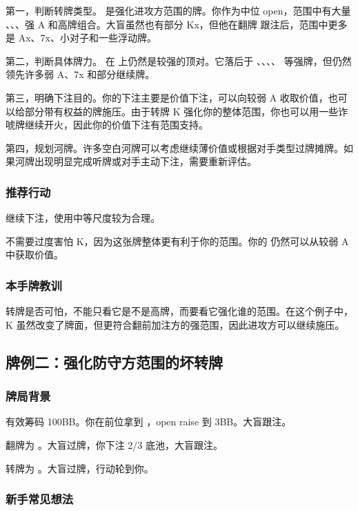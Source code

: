 第一，判断转牌类型。 是强化进攻方范围的牌。你作为中位 open，范围中有大量 、、、强 A 和高牌组合。大盲虽然也有部分 Kx，但他在翻牌  跟注后，范围中更多是 Ax、7x、小对子和一些浮动牌。

第二，判断具体牌力。 在  上仍然是较强的顶对。它落后于 、、、、 等强牌，但仍然领先许多弱 A、7x 和部分继续牌。

第三，明确下注目的。你的下注主要是价值下注，可以向较弱 A 收取价值，也可以给部分带有权益的牌施压。由于转牌 K 强化你的整体范围，你也可以用一些诈唬牌继续开火，因此你的价值下注有范围支持。

第四，规划河牌。许多空白河牌可以考虑继续薄价值或根据对手类型过牌摊牌。如果河牌出现明显完成听牌或对手主动下注，需要重新评估。

\subsubsection*{推荐行动}

继续下注，使用中等尺度较为合理。

不需要过度害怕 K，因为这张牌整体更有利于你的范围。你的  仍然可以从较弱 A 中获取价值。

\subsubsection*{本手牌教训}

转牌是否可怕，不能只看它是不是高牌，而要看它强化谁的范围。在这个例子中，K 虽然改变了牌面，但更符合翻前加注方的强范围，因此进攻方可以继续施压。

\subsection{牌例二：强化防守方范围的坏转牌}

\subsubsection*{牌局背景}

有效筹码 100BB。你在前位拿到 ，open raise 到 3BB。大盲跟注。

翻牌为 。大盲过牌，你下注 2/3 底池，大盲跟注。

转牌为 。大盲过牌，行动轮到你。

\subsubsection*{新手常见想法}

